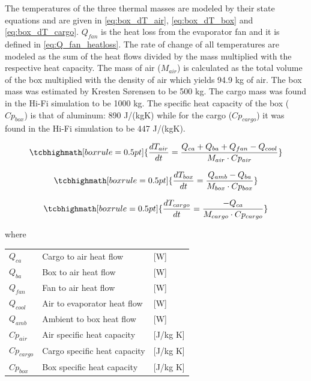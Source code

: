 The temperatures of the three thermal masses are modeled by their state equations and are given in \cref{eq:box_dT_air}, \cref{eq:box_dT_box} and \cref{eq:box_dT_cargo}. $Q_{fan}$ is the heat loss from the evaporator fan and it is defined in \cref{eq:Q_fan_heatloss}. The rate of change of all temperatures are modeled as the sum of the heat flows divided by the mass multiplied with the respective heat capacity. The mass of air ($M_{air}$) is calculated as the total volume of the box multiplied with the density of air which yields 94.9 \si{kg} of air. The box mass was estimated by Kresten Sørensen to be 500 \si{kg}. The cargo mass was found in the Hi-Fi simulation to be 1000 \si{kg}. The specific heat capacity of the box ($Cp_{box}$) is that of aluminum: 890 \si{J}/(\si{kg}\si{K}) while for the cargo ($Cp_{cargo}$) it was found in the Hi-Fi simulation to be 447 \si{J}/(\si{kg}\si{K}).

\begin{equation}
	\tcbhighmath[boxrule = 0.5pt]{\frac{dT_{air}}{dt} = \frac{Q_{ca} + Q_{ba} + Q_{fan} -Q_{cool}}{M_{air} \cdot Cp_{air}}} \label{eq:box_dT_air}
\end{equation}

\begin{equation}
	\tcbhighmath[boxrule = 0.5pt]{\frac{dT_{box}}{dt} = \frac{Q_{amb} - Q_{ba}}{M_{box} \cdot Cp_{box}}} \label{eq:box_dT_box}
\end{equation}

\begin{equation}
	\tcbhighmath[boxrule = 0.5pt]{\frac{dT_{cargo}}{dt} = \frac{-Q_{ca}}{M_{cargo} \cdot Cp_{cargo}}} \label{eq:box_dT_cargo}
\end{equation}


where
\smallskip
\begin{center}
	\begin{tabular}{l p{8cm} l}
		$Q_{ca}$     & Cargo to air heat flow       & [\si{W}]                \\
		$Q_{ba}$     & Box to air heat flow         & [\si{W}]                \\
		$Q_{fan}$    & Fan to air heat flow         & [\si{W}]                \\
		$Q_{cool}$   & Air to evaporator heat flow  & [\si{W}]                \\
		$Q_{amb}$    & Ambient to box heat flow     & [\si{W}]                \\
		$Cp_{air}$   & Air specific heat capacity   & [\si{J}/\si{kg} \si{K}] \\
		$Cp_{cargo}$ & Cargo specific heat capacity & [\si{J}/\si{kg} \si{K}] \\
		$Cp_{box}$   & Box specific heat capacity & [\si{J}/\si{kg} \si{K}]
	\end{tabular}
\end{center}

